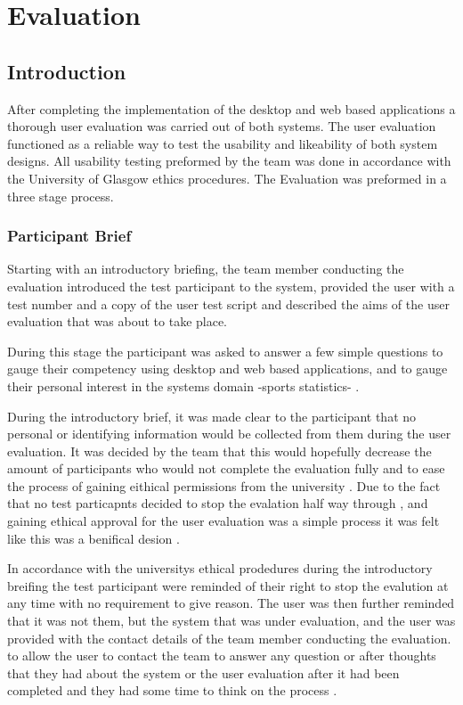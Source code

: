 \section{Evaluation}

\subsection{Introduction}

After completing the implementation of the desktop and web based applications a thorough user evaluation was carried out of both systems. The user evaluation functioned as a reliable way to test the usability and likeability of both system designs. All usability testing preformed by the team was done in accordance with the University of Glasgow ethics procedures. The Evaluation was preformed in a three stage process. 


\subsubsection{ Participant Brief }

Starting with an introductory briefing, the team member conducting the evaluation introduced the test participant to the system, provided the user with a test number and a copy of the user test script and described the aims of the user evaluation that was about to take place.  

During this stage the participant was asked to answer a few simple questions to gauge their competency using desktop and web based applications, and to gauge their personal interest in the systems domain -sports statistics- .

 During the introductory brief, it was made clear to the participant that no personal or identifying information would be collected from them during the user evaluation.  It was decided by the team that this would hopefully decrease the amount of participants who would not complete the evaluation fully and to ease the process of gaining eithical permissions from the university . Due to the fact that no test particapnts decided to stop the evalation half way through , and gaining ethical approval for the user evaluation was a simple process it was felt like this was a benifical desion . 

In accordance with the universitys ethical prodedures during the introductory breifing the test participant were reminded of their right to stop the evalution at any time with no requirement to give reason. The user was then further reminded that it was not them, but the system that was under evaluation, and the user was provided with the contact details of the team member conducting the evaluation. to allow the user to contact the team to answer any question or after thoughts that they had about the system or the user evaluation after it had been completed and they had some time to think on the process .

